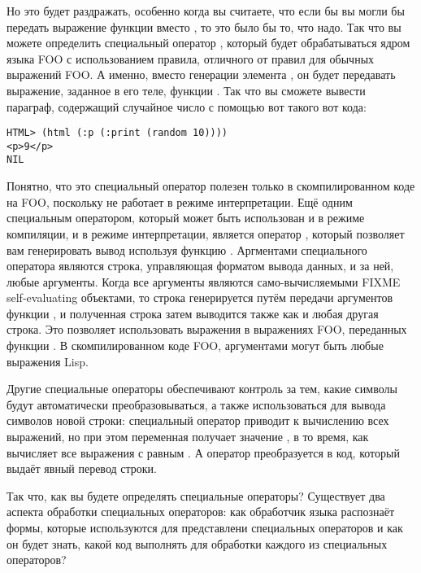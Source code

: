 Но это будет раздражать, особенно когда вы считаете, что если бы вы могли бы передать
выражение  функции  вместо , то это
было бы то, что надо.  Так что вы можете определить специальный оператор ,
который будет обрабатываться ядром языка FOO с использованием правила, отличного от правил
для обычных выражений FOO.  А именно, вместо генерации элемента , он будет
передавать выражение, заданное в его теле, функции .  Так что вы сможете
вывести параграф, содержащий случайное число с помощью вот такого вот кода:

\begin{lstlisting}
HTML> (html (:p (:print (random 10))))
<p>9</p>
NIL
\end{lstlisting}

Понятно, что это специальный оператор полезен только в скомпилированном коде на FOO,
поскольку  не работает в режиме интерпретации.  Ещё одним специальным
оператором, который может быть использован и в режиме компиляции, и в режиме
интерпретации, является оператор , который позволяет вам генерировать вывод
используя функцию .  Аргментами специального оператора 
являются строка, управляющая форматом вывода данных, и за ней, любые аргументы.  Когда все
аргументы  являются само-вычисляемыми FIXME self-evaluating объектами, то
строка генерируется путём передачи аргументов функции , и полученная строка
затем выводится также как и любая другая строка.  Это позволяет использовать выражения
 в выражениях FOO, переданных функции .  В скомпилированном
коде FOO, аргументами  могут быть любые выражения Lisp.

Другие специальные операторы обеспечивают контроль за тем, какие символы будут
автоматически преобразовываться, а также использоваться для вывода символов новой строки:
специальный оператор  приводит к вычислению всех выражений, но при этом
переменная  получает значение , в то время, как
 вычисляет все выражения с  равным
.  А оператор  преобразуется в код, который
выдаёт явный перевод строки.

Так что, как вы будете определять специальные операторы?  Существует два аспекта обработки
специальных операторов: как обработчик языка распознаёт формы, которые используются для
представлени специальных операторов и как он будет знать, какой код выполнять для
обработки каждого из специальных операторов?

